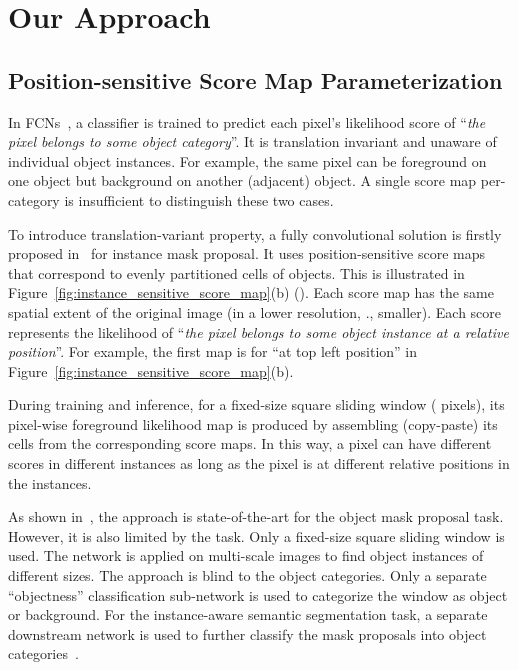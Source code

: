\documentclass[10pt,twocolumn,letterpaper]{article}
\begin{document}
\section{Our Approach}

\subsection{Position-sensitive Score Map Parameterization}
\label{sec.position_sensitive_score_review}
In FCNs~\cite{long2015fully}, a classifier is trained to predict each pixel's likelihood score of ``\emph{the pixel belongs to some object category}''. It is translation invariant and unaware of individual object instances. For example, the same pixel can be foreground on one object but background on another (adjacent) object. A single score map per-category is insufficient to distinguish these two cases.

To introduce translation-variant property, a fully convolutional solution is firstly proposed in~\cite{dai2016instance} for instance mask proposal. It uses  position-sensitive score maps that correspond to  evenly partitioned cells of objects. This is illustrated in Figure~\ref{fig:instance_sensitive_score_map}(b) (). Each score map has the same spatial extent of the original image (in a lower resolution, \eg.,  smaller). Each score represents the likelihood of ``\emph{the pixel belongs to some object instance at a relative position}''. For example, the first map is for ``at top left position'' in Figure~\ref{fig:instance_sensitive_score_map}(b).

During training and inference, for a fixed-size square sliding window ( pixels), its pixel-wise foreground likelihood map is produced by assembling (copy-paste) its  cells from the corresponding score maps. In this way, a pixel can have different scores in different instances as long as the pixel is at different relative positions in the instances.

As shown in~\cite{dai2016instance}, the approach is state-of-the-art for the object mask proposal task. However, it is also limited by the task. Only a fixed-size square sliding window is used. The network is applied on multi-scale images to find object instances of different sizes. The approach is blind to the object categories. Only a separate ``objectness'' classification sub-network is used to categorize the window as object or background. For the instance-aware semantic segmentation task, a separate downstream network is used to further classify the mask proposals into object categories~\cite{dai2016instance}.
\end{document}
